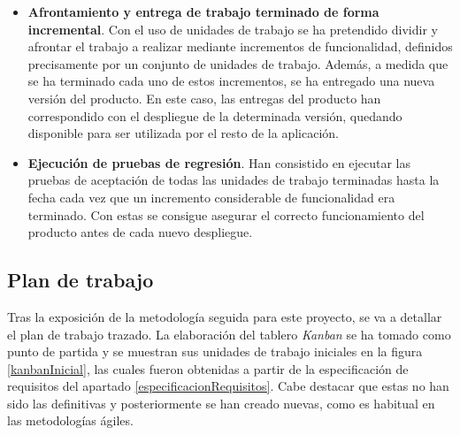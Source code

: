 \documentclass[11pt,spanish,listoffigures]{tfgetsinf}
\begin{document}
\begin{itemize}
	\item \textbf{Afrontamiento y entrega de trabajo terminado de forma incremental}. Con el uso de unidades de trabajo se ha pretendido dividir y afrontar el trabajo a realizar mediante incrementos de funcionalidad, definidos precisamente por un conjunto de unidades de trabajo. Además, a medida que se ha terminado cada uno de estos incrementos, se ha entregado una nueva versión del producto. En este caso, las entregas del producto han correspondido con el despliegue de la determinada versión, quedando disponible para ser utilizada por el resto de la aplicación.

	\item \textbf{Ejecución de pruebas de regresión}. Han consistido en ejecutar las pruebas de aceptación de todas las unidades de trabajo terminadas hasta la fecha cada vez que un incremento considerable de funcionalidad era terminado. Con estas se consigue asegurar el correcto funcionamiento del producto antes de cada nuevo despliegue.

\end{itemize}


		\subsection{Plan de trabajo} \label{planDeTrabajo}

Tras la exposición de la metodología seguida para este proyecto, se va a detallar el plan de trabajo trazado. La elaboración del tablero \emph{Kanban} se ha tomado como punto de partida y se muestran sus unidades de trabajo iniciales en la figura \ref{kanbanInicial}, las cuales fueron obtenidas a partir de la especificación de requisitos del apartado \ref{especificacionRequisitos}. Cabe destacar que estas no han sido las definitivas y posteriormente se han creado nuevas, como es habitual en las metodologías ágiles.

\end{document}
